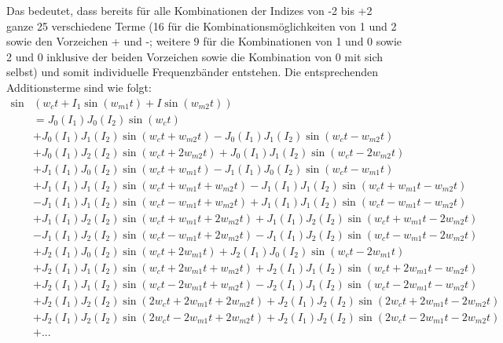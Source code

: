 Das bedeutet, dass bereits für alle Kombinationen der Indizes von -2 bis +2 ganze 25 verschiedene Terme (16 für die Kombinationsmöglichkeiten von 1 und 2 sowie den Vorzeichen + und -; weitere 9 für die Kombinationen von 1 und 0 sowie 2 und 0 inklusive der beiden Vorzeichen sowie die Kombination von 0 mit sich selbst) und somit individuelle Frequenzbänder entstehen. Die entsprechenden Additionsterme sind wie folgt:
\begin{equation}
\begin{split}
\sin&(w_ct + I_1\sin(w_{m1}t) + I\sin(w_{m2}t)) \\
&= J_0(I_1)J_0(I_2)\sin(w_ct) \\
&+ J_0(I_1)J_1(I_2)\sin(w_ct + w_{m2}t) - J_0(I_1)J_1(I_2)\sin(w_ct - w_{m2}t) \\
&+ J_0(I_1)J_2(I_2)\sin(w_ct + 2w_{m2}t) + J_0(I_1)J_1(I_2)\sin(w_ct - 2w_{m2}t) \\
&+ J_1(I_1)J_0(I_2)\sin(w_ct + w_{m1}t) - J_1(I_1)J_0(I_2)\sin(w_ct - w_{m1}t) \\
&+ J_1(I_1)J_1(I_2)\sin(w_ct + w_{m1}t + w_{m2}t) - J_1(I_1)J_1(I_2)\sin(w_ct + w_{m1}t - w_{m2}t) \\
&- J_1(I_1)J_1(I_2)\sin(w_ct - w_{m1}t + w_{m2}t) + J_1(I_1)J_1(I_2)\sin(w_ct - w_{m1}t - w_{m2}t) \\
&+ J_1(I_1)J_2(I_2)\sin(w_ct + w_{m1}t + 2w_{m2}t) + J_1(I_1)J_2(I_2)\sin(w_ct + w_{m1}t - 2w_{m2}t) \\
&- J_1(I_1)J_2(I_2)\sin(w_ct - w_{m1}t + 2w_{m2}t) - J_1(I_1)J_2(I_2)\sin(w_ct - w_{m1}t - 2w_{m2}t) \\
&+ J_2(I_1)J_0(I_2)\sin(w_ct + 2w_{m1}t) + J_2(I_1)J_0(I_2)\sin(w_ct - 2w_{m1}t) \\
&+ J_2(I_1)J_1(I_2)\sin(w_ct + 2w_{m1}t + w_{m2}t) + J_2(I_1)J_1(I_2)\sin(w_ct + 2w_{m1}t - w_{m2}t) \\
&+ J_2(I_1)J_1(I_2)\sin(w_ct - 2w_{m1}t + w_{m2}t) - J_2(I_1)J_1(I_2)\sin(w_ct - 2w_{m1}t - w_{m2}t) \\
&+ J_2(I_1)J_2(I_2)\sin(2w_ct + 2w_{m1}t + 2w_{m2}t) + J_2(I_1)J_2(I_2)\sin(2w_ct + 2w_{m1}t - 2w_{m2}t) \\
&+ J_2(I_1)J_2(I_2)\sin(2w_ct - 2w_{m1}t + 2w_{m2}t) + J_2(I_1)J_2(I_2)\sin(2w_ct - 2w_{m1}t - 2w_{m2}t) \\
&+ ... 
\end{split}
\end{equation}

